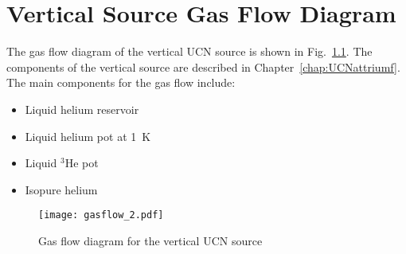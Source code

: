 \chapter{ Vertical Source Gas Flow Diagram}
The gas flow diagram of the vertical UCN source is shown in
Fig.~\ref{fig:gasflow}. The components of the vertical source are
described in Chapter~\ref{chap:UCNattriumf}. The main components for
the gas flow include:
\begin{itemize}
\item Liquid helium reservoir
\item Liquid helium pot at 1~K
\item Liquid $^3$He pot
\item Isopure helium
\end{itemize}
\begin{figure}[h]
  \centering
    \texttt{[image: gasflow\_2.pdf]}
    \caption{ Gas flow diagram for the vertical UCN source }
    \label{fig:gasflow}
\end{figure}